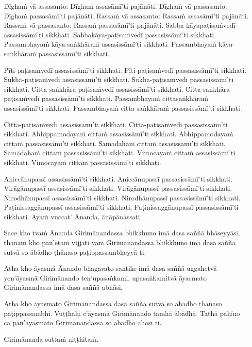 Dīghaṁ vā assasanto: Dīghaṁ assasāmī’ti pajānāti. Dīghaṁ vā passasanto:
Dīghaṁ passasāmī’ti pajānāti. Rassaṁ vā assasanto: Rassaṁ assasāmī’ti
pajānāti. Rassaṁ vā passasanto: Rassaṁ passasāmī’ti pajānāti.
Sabba-kāyapaṭisaṁvedī assasissāmī’ti sikkhati. Sabbakāya-paṭisaṁvedī
passasissāmī’ti sikkhati. Passambhayaṁ kāya-saṅkhāraṁ assasissāmī’ti
sikkhati. Passambhayaṁ kāya-saṅkhāraṁ passasissāmī’ti sikkhati.

Pīti-paṭisaṁvedī assasissāmī’ti sikkhati. Pīti-paṭisaṁvedī passasissāmī’ti
sikkhati. Sukha-paṭisaṁvedī assasissāmī’ti sikkhati. Sukha-paṭisaṁvedī
passasissāmī’ti sikkhati. Citta-saṅkhāra-paṭisaṁvedī assasissāmī’ti sikkhati.
Citta-saṅkhāra-paṭisaṁvedī passasissāmī’ti sikkhati. Passambhayaṁ
cittasaṅkhāraṁ assasissāmī’ti sikkhati. Passambhayaṁ citta-saṅkhāraṁ
passasissāmī’ti sikkhati.

Citta-paṭisaṁvedī assasissāmī’ti sikkhati. Citta-paṭisaṁvedī passasissāmī’ti
sikkhati. Abhippamodayaṁ cittaṁ assasissāmī’ti sikkhati. Abhippamodayaṁ
cittaṁ passasissāmī’ti sikkhati. Samādahaṁ cittaṁ assasissāmī’ti sikkhati.
Samādahaṁ cittaṁ passasissāmī’ti sikkhati. Vimocayaṁ cittaṁ assasissāmī’ti
sikkhati. Vimocayaṁ cittaṁ passasissāmī’ti sikkhati.

Aniccānupassī assasissāmī’ti sikkhati. Aniccānupassī passasissāmī’ti
sikkhati. Virāgānupassī assasissāmī’ti sikkhati. Virāgānupassī
passasissāmī’ti sikkhati. Nirodhānupassī assasissāmī’ti sikkhati.
Nirodhānupassī passasissāmī’ti sikkhati. Paṭinissaggānupassī assasissāmī’ti
sikkhati. Paṭinissaggānupassī passasissāmī’ti sikkhati. Ayaṁ vuccat’ Ānanda,
ānāpānassati.

Sace kho tvaṁ Ānanda Girimānandassa bhikkhuno imā dasa saññā bhāseyyāsi,
ṭhānaṁ kho pan’etaṁ vijjati yaṁ Girimānandassa bhikkhuno imā dasa saññā sutvā so
ābādho ṭhānaso paṭippassambheyyā ti.

Atha kho āyasmā Ānando bhagavato santike imā dasa saññā uggahetvā yen’āyasmā
Girimānando ten’upasaṅkami, upasaṅkamitvā āyasmato Girimānandassa imā dasa saññā
abhāsi.

Atha kho āyasmato Girimānandassa dasa saññā sutvā so ābādho ṭhānaso
paṭippassambhi. Vuṭṭhahi c’āyasmā Girimānando tamhā ābādhā. Tathā pahīno ca
pan’āyasmato Girimānandassa so ābādho ahosī ti.

Girimānanda-suttaṁ niṭṭhitaṁ. 

